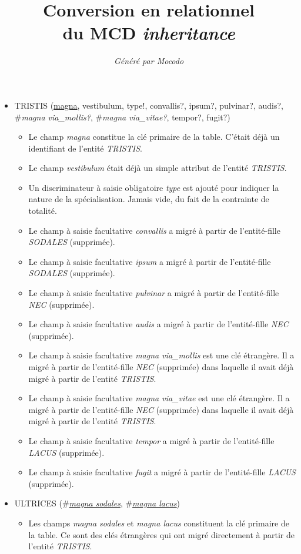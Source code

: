 \documentclass[a4paper]{article}
\title{Conversion en relationnel\\du MCD \emph{inheritance}}
\author{\emph{Généré par Mocodo}}
\newcommand{\relat}[1]{\textsc{#1}}
\newcommand{\attr}[1]{#1}
\newcommand{\prim}[1]{\uline{#1}}
\newcommand{\foreign}[1]{\#\textsl{#1}}
\begin{document}
\maketitle

\begin{itemize}
  \item \relat{TRISTIS} (\prim{magna}, \attr{vestibulum}, \attr{type!}, \attr{convallis?}, \attr{ipsum?}, \attr{pulvinar?}, \attr{audis?}, \foreign{magna via\_mollis?}, \foreign{magna via\_vitae?}, \attr{tempor?}, \attr{fugit?})
  \begin{itemize}
    \item Le champ \emph{magna} constitue la clé primaire de la table. C'était déjà un identifiant de l'entité \emph{TRISTIS}.
    \item Le champ \emph{vestibulum} était déjà un simple attribut de l'entité \emph{TRISTIS}.
    \item Un discriminateur à saisie obligatoire \emph{type} est ajouté pour indiquer la nature de la spécialisation. Jamais vide, du fait de la contrainte de totalité.
    \item Le champ à saisie facultative \emph{convallis} a migré à partir de l'entité-fille \emph{SODALES} (supprimée).
    \item Le champ à saisie facultative \emph{ipsum} a migré à partir de l'entité-fille \emph{SODALES} (supprimée).
    \item Le champ à saisie facultative \emph{pulvinar} a migré à partir de l'entité-fille \emph{NEC} (supprimée).
    \item Le champ à saisie facultative \emph{audis} a migré à partir de l'entité-fille \emph{NEC} (supprimée).
    \item Le champ à saisie facultative \emph{magna via\_mollis} est une clé étrangère. Il a migré à partir de l'entité-fille \emph{NEC} (supprimée) dans laquelle il avait déjà migré à partir de l'entité \emph{TRISTIS}.
    \item Le champ à saisie facultative \emph{magna via\_vitae} est une clé étrangère. Il a migré à partir de l'entité-fille \emph{NEC} (supprimée) dans laquelle il avait déjà migré à partir de l'entité \emph{TRISTIS}.
    \item Le champ à saisie facultative \emph{tempor} a migré à partir de l'entité-fille \emph{LACUS} (supprimée).
    \item Le champ à saisie facultative \emph{fugit} a migré à partir de l'entité-fille \emph{LACUS} (supprimée).
  \end{itemize}

  \item \relat{ULTRICES} (\foreign{\prim{magna sodales}}, \foreign{\prim{magna lacus}})
  \begin{itemize}
    \item Les champs \emph{magna sodales} et \emph{magna lacus} constituent la clé primaire de la table. Ce sont des clés étrangères qui ont migré directement à partir de l'entité \emph{TRISTIS}.
  \end{itemize}

\end{itemize}
\end{document}
